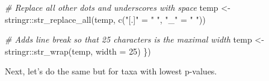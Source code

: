 \documentclass[
  oneside]{book}
\newenvironment{Shaded}{\begin{snugshade}}{\end{snugshade}}
\newcommand{\AttributeTok}[1]{\textcolor[rgb]{0.77,0.63,0.00}{#1}}
\newcommand{\CommentTok}[1]{\textcolor[rgb]{0.56,0.35,0.01}{\textit{#1}}}
\newcommand{\DecValTok}[1]{\textcolor[rgb]{0.00,0.00,0.81}{#1}}
\newcommand{\FunctionTok}[1]{\textcolor[rgb]{0.00,0.00,0.00}{#1}}
\newcommand{\NormalTok}[1]{#1}
\newcommand{\OtherTok}[1]{\textcolor[rgb]{0.56,0.35,0.01}{#1}}
\newcommand{\SpecialCharTok}[1]{\textcolor[rgb]{0.00,0.00,0.00}{#1}}
\newcommand{\StringTok}[1]{\textcolor[rgb]{0.31,0.60,0.02}{#1}}
\begin{document}
\begin{Shaded}
\begin{Highlighting}[]
  \CommentTok{\# Replace all other dots and underscores with space}
\NormalTok{  temp }\OtherTok{\textless{}{-}}\NormalTok{ stringr}\SpecialCharTok{::}\FunctionTok{str\_replace\_all}\NormalTok{(temp, }\FunctionTok{c}\NormalTok{(}\StringTok{"[.]"} \OtherTok{=} \StringTok{" "}\NormalTok{, }\StringTok{"\_"} \OtherTok{=} \StringTok{" "}\NormalTok{))}
  
  \CommentTok{\# Adds line break so that 25 characters is the maximal width}
\NormalTok{  temp }\OtherTok{\textless{}{-}}\NormalTok{ stringr}\SpecialCharTok{::}\FunctionTok{str\_wrap}\NormalTok{(temp, }\AttributeTok{width =} \DecValTok{25}\NormalTok{)}
\NormalTok{\})}
\end{Highlighting}
\end{Shaded}

Next, let's do the same but for taxa with lowest p-values.
\end{document}
